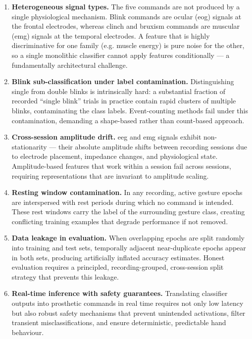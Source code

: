 \begin{enumerate}[leftmargin=*, label=\textbf{P\arabic*.}]

    \item \textbf{Heterogeneous signal types.} The five commands are
    not produced by a single physiological mechanism. Blink commands
    are ocular (\acrshort{eog}) signals at the frontal electrodes,
    whereas clinch and bruxism commands are muscular (\acrshort{emg})
    signals at the temporal electrodes. A feature that is highly
    discriminative for one family (e.g. muscle energy) is pure noise
    for the other, so a single monolithic classifier cannot apply
    features conditionally — a fundamentally architectural challenge.

    \item \textbf{Blink sub-classification under label contamination.}
    Distinguishing single from double blinks is intrinsically hard:
    a substantial fraction of recorded ``single blink'' trials in
    practice contain rapid clusters of multiple blinks, contaminating
    the class labels. Event-counting methods fail under this
    contamination, demanding a shape-based rather than count-based
    approach.

    \item \textbf{Cross-session amplitude drift.} \acrshort{eeg}
    and \acrshort{emg} signals exhibit non-stationarity — their
    absolute amplitude shifts between recording sessions due to
    electrode placement, impedance changes, and physiological state.
    Amplitude-based features that work within a session fail across
    sessions, requiring representations that are invariant to
    amplitude scaling.

    \item \textbf{Resting window contamination.} In any recording,
    active gesture epochs are interspersed with rest periods during
    which no command is intended. These rest windows carry the label
    of the surrounding gesture class, creating conflicting training
    examples that degrade performance if not removed.

    \item \textbf{Data leakage in evaluation.} When overlapping
    epochs are split randomly into training and test sets, temporally
    adjacent near-duplicate epochs appear in both sets, producing
    artificially inflated accuracy estimates. Honest evaluation
    requires a principled, recording-grouped, cross-session split
    strategy that prevents this leakage.

    \item \textbf{Real-time inference with safety guarantees.}
    Translating classifier outputs into prosthetic commands in
    real time requires not only low latency but also robust safety
    mechanisms that prevent unintended activations, filter transient
    misclassifications, and ensure deterministic, predictable hand
    behaviour.

\end{enumerate}

